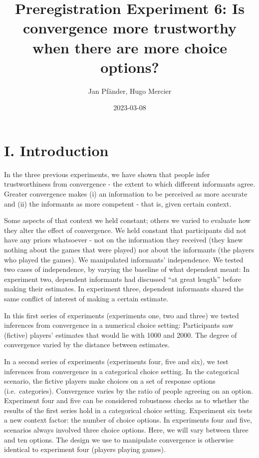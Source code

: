 \documentclass[
]{article}
\title{Preregistration Experiment 6: Is convergence more trustworthy
when there are more choice options?}
\author{Jan Pfänder, Hugo Mercier}
\date{2023-03-08}
\begin{document}
\maketitle

\hypertarget{i.-introduction}{%
\section{I. Introduction}\label{i.-introduction}}

In the three previous experiments, we have shown that people infer
trustworthiness from convergence - the extent to which different
informants agree. Greater convergence makes (i) an information to be
perceived as more accurate and (ii) the informants as more competent -
that is, given certain context.

Some aspects of that context we held constant; others we varied to
evaluate how they alter the effect of convergence. We held constant that
participants did not have any priors whatsoever - not on the information
they received (they knew nothing about the games that were played) nor
about the informants (the players who played the games). We manipulated
informants' independence. We tested two cases of independence, by
varying the baseline of what dependent meant: In experiment two,
dependent informants had discussed ``at great length'' before making
their estimates. In experiment three, dependent informants shared the
same conflict of interest of making a certain estimate.

In this first series of experiments (experiments one, two and three) we
tested inferences from convergence in a numerical choice setting:
Participants saw (fictive) players' estimates that would lie with 1000
and 2000. The degree of convergence varied by the distance between
estimates.

In a second series of experiments (experiments four, five and six), we
test inferences from convergence in a categorical choice setting. In the
categorical scenario, the fictive players make choices on a set of
response options (i.e.~categories). Convergence varies by the ratio of
people agreeing on an option. Experiment four and five can be considered
robustness checks as to whether the results of the first series hold in
a categorical choice setting. Experiment six tests a new context factor:
the number of choice options. In experiments four and five, scenarios
always involved three choice options. Here, we will vary between three
and ten options. The design we use to manipulate convergence is
otherwise identical to experiment four (players playing games).
\end{document}
